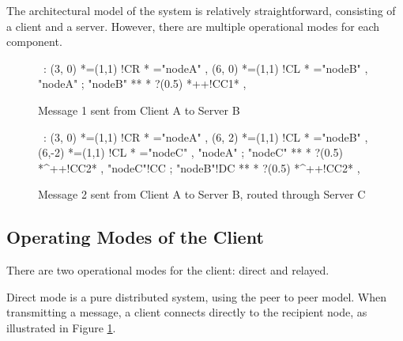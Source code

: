 
The architectural model of the system is relatively straightforward,
consisting of a client and a server. However, there are multiple
operational modes for each component.

\begin{figure}[ht]

\hspace{10mm}

\small

\begin{center}
\ \xy<1cm,0cm>:
(3, 0) *=(1,1) !CR  *\frm<44mm>{-} ="nodeA" , 
(6, 0) *=(1,1) !CL  *\frm{-} ="nodeB" , 
"nodeA" ; "nodeB" **\dir{-} *\dir{>} ?(0.5) *++!CC{1}* , 
\endxy
\end{center}

\hspace{10mm}

\label{fig:client}

\caption{Message 1 sent from Client A to Server B}

\end{figure}

\begin{figure}[ht]

\small

\begin{center}
\ \xy<1cm,0cm>:
(3, 0) *=(1,1) !CR  *\frm<44mm>{-} ="nodeA" , 
(6, 2) *=(1,1) !CL  *\frm{-} ="nodeB" , 
(6,-2) *=(1,1) !CL  *\frm{-} ="nodeC" , 
"nodeA" ; "nodeC" **\dir{-} *\dir{>} ?(0.5) *^++!CC{2}* , 
"nodeC"!CC ; "nodeB"!DC **\dir{-} *\dir{>} ?(0.5) *^++!CC{2}* , 
\endxy
\end{center}

\caption{Message 2 sent from Client A to Server B, routed through Server C}

\label{fig:relay}

\end{figure}

\subsection{Operating Modes of the Client}

There are two operational modes for the client: direct and relayed.

Direct mode is a pure distributed system, using the peer to peer model.
When transmitting a message, a client connects directly to the
recipient node, as illustrated in Figure \ref{fig:client}.


